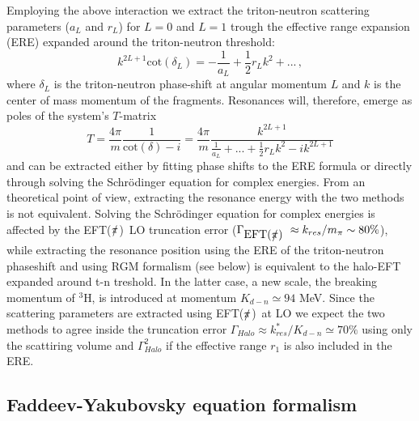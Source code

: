 \documentclass[5p,times]{elsarticle}
\newcommand{\eftnopi}{\mbox{EFT($\slashed{\pi}$) }}
\begin{document}
Employing the above interaction we extract the triton-neutron scattering parameters ($a_L$ and $r_L$) for $L=0$ and $L=1$ trough the effective range expansion (ERE) expanded around the triton-neutron threshold:
%
\begin{equation}
    k^{2L+1}\text{cot}(\delta_L)=-\frac{1}{a_L}+\frac{1}{2}r_L k^2 + ... \, ,
    \label{eq.app.ere}
\end{equation}
%
where $\delta_L$ is the triton-neutron phase-shift at angular momentum $L$ and $k$ is the center of mass momentum of the fragments. 
Resonances will, therefore, emerge as poles of the system's $T$-matrix
%
\begin{equation}
T =\frac{4\pi}{m}\frac{1}{\text{cot}(\delta)-i} =
\frac{4\pi}{m}\frac{k^{2L+1}}{\frac{1}{a_L}+...+\frac{1}{2}r_L k^2
-ik^{2L+1}} \label{eq:Tmatrix}
\end{equation}
%
and can be extracted either by fitting phase shifts to the ERE formula or directly through solving the Schr\"odinger equation for complex energies.
%
From an theoretical point of view, extracting the resonance energy with the two methods is not equivalent. 
Solving the Schr\"odinger equation for complex energies is affected by the \eftnopi LO truncation error ($\Gamma_{\eftnopi}\approx k_{res}/m_\pi\sim80\%$), while extracting the resonance position using the ERE of the triton-neutron phaseshift and using RGM formalism (see below) is equivalent to the halo-EFT expanded around t-n treshold.
In the latter case, a new scale, the breaking momentum of $^3$H, is introduced at momentum $K_{d-n}\simeq94$ MeV. 
Since the scattering parameters are extracted using \eftnopi at LO we expect the two methods to agree inside the truncation error $\Gamma_{Halo}\approx k^*_{res}/K_{d-n}\simeq70\%$ using only the scattiring volume and $\Gamma_{Halo}^2$ %
if the effective range $r_1$ is also included in the ERE.

\vspace{2mm}



\subsection{Faddeev-Yakubovsky equation formalism}
\end{document}

